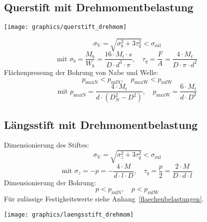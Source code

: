 	\subsection{Querstift mit Drehmomentbelastung} %
		\begin{center}
			\texttt{[image: graphics/querstift\_drehmom]}
		\end{center}
		\begin{equation*}
			\sigma_{\text{V}} = \sqrt{\sigma_b^2 + 3 \tau_q^2} < \sigma_{\text{zul}}
		\end{equation*}
		\begin{equation*}
			\text{mit } \sigma_b = \frac{M_b}{W_b}= \frac{16 \cdot M_t \cdot s}{D \cdot d^3 \cdot \pi}, \quad \tau_q = \frac{F}{A} = \frac{4 \cdot M_t}{D \cdot \pi \cdot d^2}
		\end{equation*}
		Flächenpressung der Bohrung von Nabe und Welle:
		\begin{equation*}
			p_{\text{maxN}} < p_{\text{zulN}}, \quad p_{\text{maxW}}< p_{\text{zulW}}
		\end{equation*}
		\begin{equation*}
			\text{mit } p_{\text{maxN}} = \frac{4 \cdot M_t}{d \cdot (D_N^2 - D^2)}, \quad p_{\text{maxW}} = \frac{6 \cdot M_t}{d \cdot D^2}
		\end{equation*}
	\subsection{Längsstift mit Drehmomentbelastung} %
		Dimensionierung des Stiftes:
		\begin{equation*}
			\sigma_{\text{V}} = \sqrt{\sigma_z^2 + 3 \tau_q^2} < \sigma_{\text{zul}}
		\end{equation*}
		\begin{equation*}
			\text{mit } \sigma_z = -p = -\frac{4 \cdot M}{d \cdot l \cdot D}, \quad \tau_q = \frac{p}{2} = \frac{2 \cdot M}{D \cdot d \cdot l}
		\end{equation*}
		Dimensionierung der Bohrung:
		\begin{equation*}
			p < p_{\text{zulN}}, \quad p< p_{\text{zulW}}
		\end{equation*}
		Für zulässige Festigkeitswerte siehe Anhang~\ref{flaechenbelastungen}.
		\begin{center}
			\texttt{[image: graphics/laengsstift\_drehmom]}
		\end{center}
